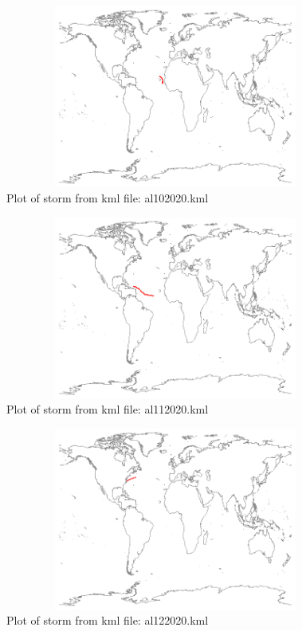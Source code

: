 \documentclass[]{article}
\begin{document}
\begin{figure}[H]
    \centering
    \includegraphics[height = 6cm, width = 12cm]{stormPlot1.png}
    \caption{Plot of storm from kml file: al102020.kml}
\end{figure}
\begin{figure}[H]
    \centering
    \includegraphics[height = 6cm, width = 12cm]{stormPlot2.png}
    \caption{Plot of storm from kml file: al112020.kml}
\end{figure}
\begin{figure}[H]
    \centering
    \includegraphics[height = 6cm, width = 12cm]{stormPlot3.png}
    \caption{Plot of storm from kml file: al122020.kml}
\end{figure}
\end{document}

